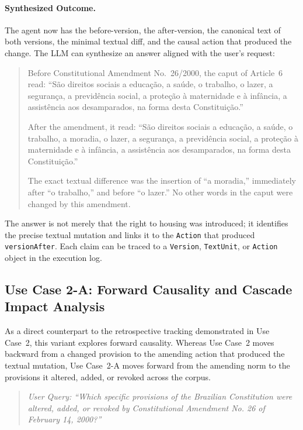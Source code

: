 \documentclass[11pt]{article}
\begin{document}
\paragraph{Synthesized Outcome.}
The agent now has the before-version, the after-version, the canonical text of both versions, the minimal textual diff, and the causal action that produced the change. The LLM can synthesize an answer aligned with the user's request:

\begin{quote}
Before Constitutional Amendment No.~26/2000, the caput of Article~6 read: ``São direitos sociais a educação, a saúde, o trabalho, o lazer, a segurança, a previdência social, a proteção à maternidade e à infância, a assistência aos desamparados, na forma desta Constituição.''

After the amendment, it read: ``São direitos sociais a educação, a saúde, o trabalho, a moradia, o lazer, a segurança, a previdência social, a proteção à maternidade e à infância, a assistência aos desamparados, na forma desta Constituição.''

The exact textual difference was the insertion of ``a moradia,'' immediately after ``o trabalho,'' and before ``o lazer.'' No other words in the caput were changed by this amendment.
\end{quote}

The answer is not merely that the right to housing was introduced; it identifies the precise textual mutation and links it to the \texttt{Action} that produced \texttt{versionAfter}. Each claim can be traced to a \texttt{Version}, \texttt{TextUnit}, or \texttt{Action} object in the execution log.

\subsection{Use Case 2-A: Forward Causality and Cascade Impact Analysis}

As a direct counterpart to the retrospective tracking demonstrated in Use Case~2, this variant explores forward causality. Whereas Use Case~2 moves backward from a changed provision to the amending action that produced the textual mutation, Use Case~2-A moves forward from the amending norm to the provisions it altered, added, or revoked across the corpus.

\begin{quote}
\textit{User Query: ``Which specific provisions of the Brazilian Constitution were altered, added, or revoked by Constitutional Amendment No. 26 of February 14, 2000?''}
\end{quote}
\end{document}
